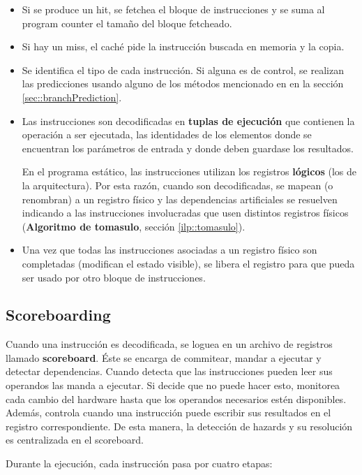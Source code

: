 \begin{itemize}
	\item Si se produce un hit, se fetchea el bloque de instrucciones y se suma al program counter el tamaño del bloque fetcheado.
	\item Si hay un miss, el caché pide la instrucción buscada en memoria y la copia.
	\item Se identifica el tipo de cada instrucción. Si alguna es de control, se realizan las predicciones usando alguno de los métodos mencionado en en la sección \ref{sec::branchPrediction}.
	\item Las instrucciones son decodificadas en  \textbf{tuplas de ejecución} que contienen la operación a ser ejecutada, las identidades de los elementos donde se encuentran los parámetros de entrada y donde deben guardase los resultados. 
	
	En el programa estático, las instrucciones utilizan los registros \textbf{lógicos} (los de la arquitectura). Por esta razón, cuando son decodificadas, se mapean (o renombran) a un registro físico y las dependencias artificiales se resuelven indicando a las instrucciones involucradas que usen distintos registros físicos (\textbf{Algoritmo de tomasulo}, sección \ref{ilp::tomasulo}).

	\item Una vez que todas las instrucciones asociadas a un registro físico son completadas (modifican el estado visible), se libera el registro para que pueda ser usado por otro bloque de instrucciones. 		
\end{itemize}

\subsection{Scoreboarding}
Cuando una instrucción es decodificada, se loguea en un archivo de registros llamado \textbf{scoreboard}. Éste se encarga de commitear, mandar a ejecutar y detectar dependencias. Cuando detecta que las instrucciones pueden leer sus operandos las manda a ejecutar. Si decide que no puede hacer esto, monitorea cada cambio del hardware hasta que los operandos necesarios estén disponibles.
Además, controla cuando una instrucción puede escribir sus resultados en el registro correspondiente. De esta manera, la detección de hazards y su resolución es centralizada en el scoreboard. 

Durante la ejecución, cada instrucción pasa por cuatro etapas:

